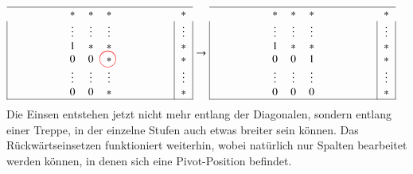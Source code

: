 \begin{align*}
\begin{tabular}{| >{$}c<{$} >{$}c<{$} >{$}c<{$} >{$}c<{$} >{$}c<{$} | >{$}c<{$} |}
\hline
\qquad\qquad &*     &*     &*     &\qquad\qquad&*     \\
       &\vdots&\vdots&\vdots&      &\vdots\\
       &1     &*     &*     &      &*     \\
       &0     &0     &*
\begin{picture}(0,0)
\color{red}\put(-3.5,3){\circle{15}}
\end{picture}
                            &      &*     \\
       &\vdots&\vdots&\vdots&      &\vdots\\
       &0     &0     &*     &      &*     \\
\hline
\end{tabular}
&\rightarrow
\begin{tabular}{| >{$}c<{$} >{$}c<{$} >{$}c<{$} >{$}c<{$} >{$}c<{$} | >{$}c<{$} |}
\hline
\qquad\qquad&*     &*     &*     &\qquad\qquad&*     \\
            &\vdots&\vdots&\vdots&            &\vdots\\
            &1     &*     &*     &            &*     \\
            &0     &0     &1     &            &*     \\
            &\vdots&\vdots&\vdots&            &\vdots\\
            &0     &0     &0     &            &*     \\
\hline
\end{tabular}
\end{align*}
Die Einsen entstehen jetzt nicht mehr entlang der Diagonalen, sondern
entlang einer Treppe, in der einzelne Stufen auch etwas breiter sein können.
Das Rückwärtseinsetzen funktioniert weiterhin, wobei natürlich nur
Spalten bearbeitet werden können, in denen sich eine Pivot-Position
befindet.

